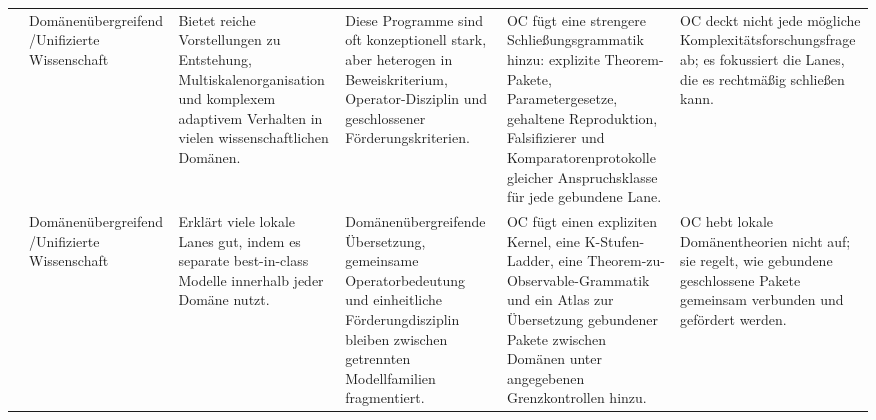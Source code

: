 \begin{longtable}{@{}L{0.17\textwidth}L{0.09\textwidth}L{0.17\textwidth}L{0.17\textwidth}L{0.20\textwidth}L{0.14\textwidth}@{}}
 & Domänenübergreifend /\allowbreak Unifizierte Wissenschaft & Bietet reiche Vorstellungen zu Entstehung, Multiskalenorganisation und komplexem adaptivem Verhalten in vielen wissenschaftlichen Domänen. & Diese Programme sind oft konzeptionell stark, aber heterogen in Beweiskriterium, Operator-Disziplin und geschlossener Förderungskriterien. & OC fügt eine strengere Schließungsgrammatik hinzu: explizite Theorem-Pakete, Parametergesetze, gehaltene Reproduktion, Falsifizierer und Komparatorenprotokolle gleicher Anspruchsklasse für jede gebundene Lane. & OC deckt nicht jede mögliche Komplexitätsforschungsfrage ab; es fokussiert die Lanes, die es rechtmäßig schließen kann. \\
 & Domänenübergreifend /\allowbreak Unifizierte Wissenschaft & Erklärt viele lokale Lanes gut, indem es separate best-in-class Modelle innerhalb jeder Domäne nutzt. & Domänenübergreifende Übersetzung, gemeinsame Operatorbedeutung und einheitliche Förderungdisziplin bleiben zwischen getrennten Modellfamilien fragmentiert. & OC fügt einen expliziten Kernel, eine K-Stufen-Ladder, eine Theorem-zu-Observable-Grammatik und ein Atlas zur Übersetzung gebundener Pakete zwischen Domänen unter angegebenen Grenzkontrollen hinzu. & OC hebt lokale Domänentheorien nicht auf; sie regelt, wie gebundene geschlossene Pakete gemeinsam verbunden und gefördert werden. \\
\bottomrule
\end{longtable}
\endgroup

